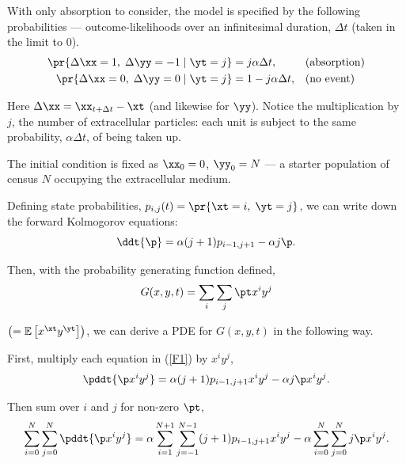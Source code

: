 With only absorption to consider, the model is specified by the following probabilities --- outcome-likelihoods over an infinitesimal duration, $\Delta t$ (taken in the limit to 0).
\begin{align*}
     \pr{\Delta\xx= 1,\;\Delta\yy = -1 \;|\; \yt = j} &= j \alpha \Delta t,  &&\text{(absorption)}\\
     \pr{\Delta\xx= 0,\;\Delta\yy = 0 \;|\; \yt = j} &= 1 -  j \alpha \Delta t,  &&\text{(no event)}
\end{align*}


\noindent
Here $\Delta \xx = \xx_{t+\Delta t} - \xt$ (and likewise for $\yy$). Notice the multiplication by $j$, the number of extracellular particles: each unit is subject to the same probability, $\alpha \Delta t$, of being taken up.

The initial condition is fixed as $\xx_0 = 0$, $\yy_0 = N$ --- a starter population of census $N$ occupying the extracellular medium.

Defining state probabilities, $p_{i,j}(t) = \pr{\xt = i,\; \yt = j}$, we can write down the forward Kolmogorov equations:
\begin{equation}
\label{F1}
\ddt{\p} = \alpha(j + 1) p_{i-1,j+1} - \alpha j \p.
\end{equation}

\noindent
Then, with the probability generating function defined,
\begin{equation}
\label{pgfDef}
G(x,y,t) = \sum_i\sum_j \pt x^iy^j
\end{equation}

\noindent
$\left(=\mathbb{E}\left[x^{\xt}y^{\yt}\right]\right)$, we can derive a PDE for $G(x,y,t)$ in the following way.

First, multiply each equation in (\ref{F1}) by $x^iy^j $,
\begin{equation*}
\pddt{\p x^iy^j} = \alpha(j + 1) p_{i-1,j+1}x^iy^j - \alpha j \p x^iy^j.
\end{equation*}

\noindent
Then sum over $i$ and $j$ for non-zero $\pt$,
\begin{equation}
\label{pdeDere2}
\sum_{i = 0}^N\sum_{j=0}^N\pddt{\p x^iy^j} = \alpha\sum_{i = 1}^{N+1}\sum_{j=-1}^{N-1}(j + 1) p_{i-1,j+1}x^iy^j - \alpha \sum_{i = 0}^N\sum_{j=0}^Nj \p x^iy^j.
\end{equation}

